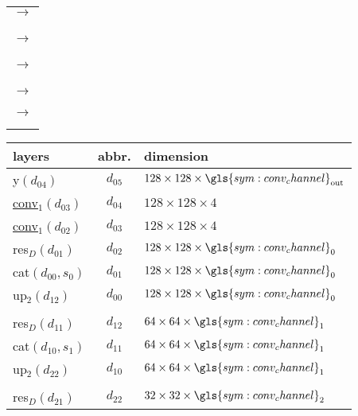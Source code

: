 \begin{center}
\begin{minipage}{0.02\textwidth}
\begin{tabular}{c}
			$\longrightarrow$\\	
			\\	
			\\	
			\\	
			$\longrightarrow$\\	
			\\	
			\\	
			\\	
			$\longrightarrow$\\	
			\\	
			\\	
			\\	
			$\longrightarrow$\\	
			\\	
			\\	
			$\longrightarrow$\\	
			\\	
			\\
		\end{tabular}
	\end{minipage}
	\hfill
	\begin{minipage}{0.55\textwidth}
		\centering
		\begin{tabular}{l|c|l}
			layers & abbr. & dimension\\
			\hline
			y$(d_{04})$ & $d_{05}$ & $128 \times 128 \times \gls{sym:conv_channel}_\text{out}$\\	
			\underline{conv}$_1(d_{03})$ & $d_{04}$ & $128 \times 128 \times 4$\\
			\underline{conv}$_1(d_{02})$ & $d_{03}$ & $128 \times 128 \times 4$\\
			res$_D(d_{01})$ & $d_{02}$ & $128 \times 128 \times \gls{sym:conv_channel}_0$\\
			cat$(d_{00},s_0)$ & $d_{01}$ & $128 \times 128 \times \gls{sym:conv_channel}_0$\\
			up$_2(d_{12})$ & $d_{00}$ & $128 \times 128 \times \gls{sym:conv_channel}_0$\\
			\hline
			&&\\
			res$_D(d_{11})$ & $d_{12}$ & $64 \times 64 \times \gls{sym:conv_channel}_1$\\
			cat$(d_{10},s_1)$ & $d_{11}$ & $64 \times 64 \times \gls{sym:conv_channel}_1$\\
			up$_2(d_{22})$ & $d_{10}$ & $64 \times 64 \times \gls{sym:conv_channel}_1$\\
			\hline
			&&\\
			res$_D(d_{21})$ & $d_{22}$ & $32 \times 32 \times \gls{sym:conv_channel}_2$\\

\end{tabular}
\end{minipage}
\end{center}
